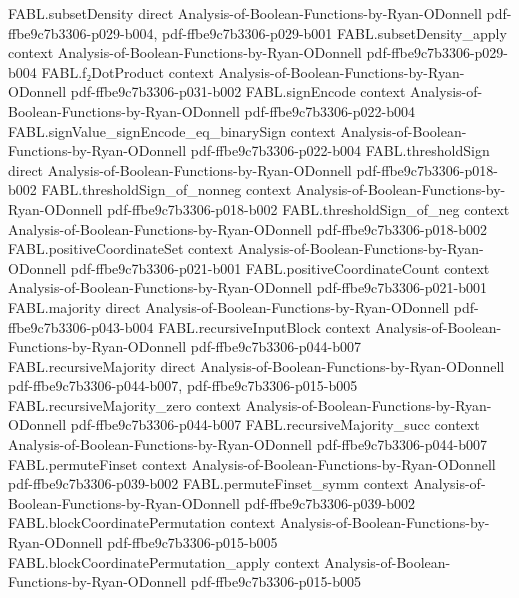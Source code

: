 \begin{theorem}
\proofstep
  {FABL.subsetDensity}
  {direct}
  {Analysis-of-Boolean-Functions-by-Ryan-ODonnell}
  {pdf-ffbe9c7b3306-p029-b004,
    pdf-ffbe9c7b3306-p029-b001}
\proofstep
  {FABL.subsetDensity_apply}
  {context}
  {Analysis-of-Boolean-Functions-by-Ryan-ODonnell}
  {pdf-ffbe9c7b3306-p029-b004}
\proofstep
  {FABL.f₂DotProduct}
  {context}
  {Analysis-of-Boolean-Functions-by-Ryan-ODonnell}
  {pdf-ffbe9c7b3306-p031-b002}
\proofstep
  {FABL.signEncode}
  {context}
  {Analysis-of-Boolean-Functions-by-Ryan-ODonnell}
  {pdf-ffbe9c7b3306-p022-b004}
\proofstep
  {FABL.signValue_signEncode_eq_binarySign}
  {context}
  {Analysis-of-Boolean-Functions-by-Ryan-ODonnell}
  {pdf-ffbe9c7b3306-p022-b004}
\proofstep
  {FABL.thresholdSign}
  {direct}
  {Analysis-of-Boolean-Functions-by-Ryan-ODonnell}
  {pdf-ffbe9c7b3306-p018-b002}
\proofstep
  {FABL.thresholdSign_of_nonneg}
  {context}
  {Analysis-of-Boolean-Functions-by-Ryan-ODonnell}
  {pdf-ffbe9c7b3306-p018-b002}
\proofstep
  {FABL.thresholdSign_of_neg}
  {context}
  {Analysis-of-Boolean-Functions-by-Ryan-ODonnell}
  {pdf-ffbe9c7b3306-p018-b002}
\proofstep
  {FABL.positiveCoordinateSet}
  {context}
  {Analysis-of-Boolean-Functions-by-Ryan-ODonnell}
  {pdf-ffbe9c7b3306-p021-b001}
\proofstep
  {FABL.positiveCoordinateCount}
  {context}
  {Analysis-of-Boolean-Functions-by-Ryan-ODonnell}
  {pdf-ffbe9c7b3306-p021-b001}
\proofstep
  {FABL.majority}
  {direct}
  {Analysis-of-Boolean-Functions-by-Ryan-ODonnell}
  {pdf-ffbe9c7b3306-p043-b004}
\proofstep
  {FABL.recursiveInputBlock}
  {context}
  {Analysis-of-Boolean-Functions-by-Ryan-ODonnell}
  {pdf-ffbe9c7b3306-p044-b007}
\proofstep
  {FABL.recursiveMajority}
  {direct}
  {Analysis-of-Boolean-Functions-by-Ryan-ODonnell}
  {pdf-ffbe9c7b3306-p044-b007,
    pdf-ffbe9c7b3306-p015-b005}
\proofstep
  {FABL.recursiveMajority_zero}
  {context}
  {Analysis-of-Boolean-Functions-by-Ryan-ODonnell}
  {pdf-ffbe9c7b3306-p044-b007}
\proofstep
  {FABL.recursiveMajority_succ}
  {context}
  {Analysis-of-Boolean-Functions-by-Ryan-ODonnell}
  {pdf-ffbe9c7b3306-p044-b007}
\proofstep
  {FABL.permuteFinset}
  {context}
  {Analysis-of-Boolean-Functions-by-Ryan-ODonnell}
  {pdf-ffbe9c7b3306-p039-b002}
\proofstep
  {FABL.permuteFinset_symm}
  {context}
  {Analysis-of-Boolean-Functions-by-Ryan-ODonnell}
  {pdf-ffbe9c7b3306-p039-b002}
\proofstep
  {FABL.blockCoordinatePermutation}
  {context}
  {Analysis-of-Boolean-Functions-by-Ryan-ODonnell}
  {pdf-ffbe9c7b3306-p015-b005}
\proofstep
  {FABL.blockCoordinatePermutation_apply}
  {context}
  {Analysis-of-Boolean-Functions-by-Ryan-ODonnell}
  {pdf-ffbe9c7b3306-p015-b005}

\end{theorem}
